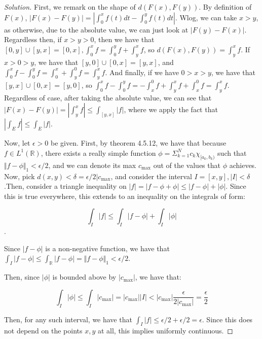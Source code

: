 \documentclass[10pt]{article}
\begin{document}
\begin{proof}[Solution]

First, we remark on the shape of $d(F(x), F(y))$. By definition of $F(x)$, $|F(x) - F(y)| = |\int_0^x f(t) dt - \int_0^y f(t) dt|$. Wlog, we can take $x > y$, as otherwise, due to the absolute value, we can just look at $|F(y) - F(x)|$. Regardless then, if $x > y > 0$, then we have that $[0,y] \cup [y,x] = [0,x], \int_0^x f = \int_0^y f + \int_y^x f$, so $d(F(x),F(y)) = \int_y^x f$. If $x > 0 > y$, we have that $[y,0] \cup [0,x] = [y,x]$, and $\int_0^x f - \int_0^y f = \int_0^x + \int_y^0 f = \int_y^x f$. And finally, if we have $0 > x > y$, we have that $[y,x] \cup [0,x] = [y,0]$, so $\int_0^x f - \int_0^y f = - \int_x^0 f + \int_y^x f + \int_x^0 f = \int_y^x f$. Regardless of case, after taking the absolute value, we can see that $|F(x) - F(y)| = |\int_y^x f| \leq \int_{[y,x]} |f|$, where we apply the fact that $|\int_E f| \leq \int_E |f|$.

Now, let $\epsilon > 0$ be given. First, by theorem 4.5.12, we have that because $f \in L^1(\mathbb{R})$, there exists a really simple function $\phi = \Sigma_{k=1}^N c_k \chi_{[a_k,b_k)}$ such that $\Vert f - \phi \Vert_1 < \epsilon/2$, and we can denote its max $c_{\max}$ out of the values that $\phi$ achieves. Now, pick $d(x,y) < \delta = \epsilon/2|c_{\max}$, and consider the interval $I =[x,y], |I| < \delta$.Then, consider a triangle inequality on $| f | = | f - \phi + \phi | \leq | f - \phi |  + | \phi |$. Since this is true everywhere, this extends to an inequality on the integrals of form:

$$ \int_I |f| \leq \int_I |f - \phi| + \int_I |\phi|$$. 

Since $| f - \phi|$ is a non-negative function, we have that $\int_I | f - \phi| \leq \int_{\mathbb{R}} |f - \phi| = \Vert f - \phi \Vert_1  < \epsilon/2$.

Then, since $|\phi|$ is bounded above by $|c_{\max}|$, we have that:

$$ \int_I |\phi| \leq \int_I |c_{\max}| = |c_{\max}| |I| < |c_{\max}| \frac{ \epsilon}{2|c_{\max}|} = \frac{\epsilon}{2}$$

Then, for any such interval, we have that $ \int_I |f|  \leq \epsilon/2 + \epsilon/2 = \epsilon$. Since this does not depend on the points $x,y$ at all, this implies uniformly continuous.

\end{proof}
\end{document}
